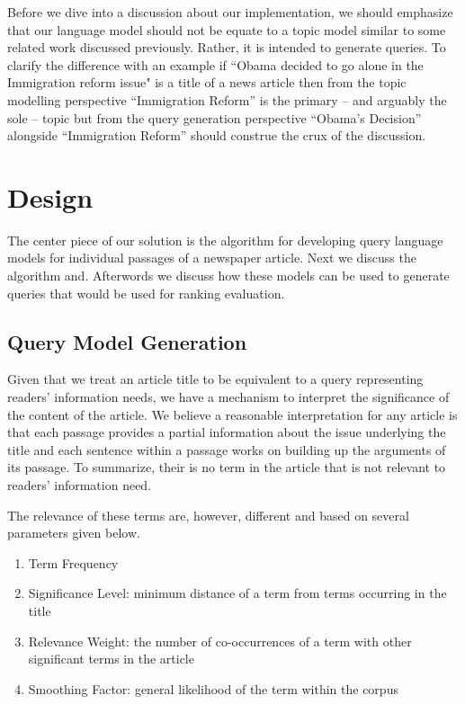 \documentclass[article]{IEEEtran}
\begin{document}
Before we dive into a discussion about our implementation, we should emphasize that our language model should not be equate to a topic model similar to some related work discussed previously. Rather, it is intended to generate queries. To clarify the difference with an example if ``Obama decided to go alone in the Immigration reform issue" is a title of a news article then from the topic modelling perspective ``Immigration Reform'' is the primary -- and arguably the sole -- topic but from the query generation perspective ``Obama's Decision'' alongside ``Immigration Reform'' should construe the crux of the discussion.    

\section{Design}
\label{des}
The center piece of our solution is the algorithm for developing query language models for individual passages of a newspaper article. Next we discuss the algorithm and. Afterwords we discuss how these models can be used to generate queries that would be used for ranking evaluation.   

\subsection{Query Model Generation}
Given that we treat an article title to be equivalent to a query representing readers' information needs, we have a mechanism to interpret the significance of the content of the article. We believe a reasonable interpretation for any article is that each passage provides a partial information about the issue underlying the title and each sentence within a passage works on building up the arguments of its passage. To summarize, their is no term in the article that is not relevant to readers' information need.     

The relevance of these terms are, however, different and based on several parameters given below. 

\begin{enumerate}
\item Term Frequency
\item Significance Level: minimum distance of a term from terms occurring in the title
\item Relevance Weight: the number of co-occurrences of a term with other significant terms in the article 
\item Smoothing Factor: general likelihood of the term within the corpus      
\end{enumerate}
\end{document}
